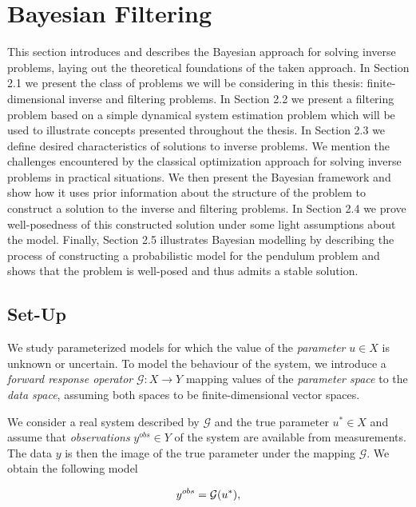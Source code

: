 \section{Bayesian Filtering}

This section introduces and describes the Bayesian approach for solving inverse problems, laying out the theoretical foundations of the taken approach. In Section 2.1 we present the class of problems we will be considering in this thesis: finite-dimensional inverse and filtering problems. In Section 2.2 we present a filtering problem based on a simple dynamical system estimation problem which will be used to illustrate concepts presented throughout the thesis. In Section 2.3 we define desired characteristics of solutions to inverse problems. We mention the challenges encountered by the classical optimization approach for solving inverse problems in practical situations. We then present the Bayesian framework and show how it uses prior information about the structure of the problem to construct a solution to the inverse and filtering problems. In Section 2.4 we prove well-posedness of this constructed solution under some light assumptions about the model. Finally, Section 2.5 illustrates Bayesian modelling by describing the process of constructing a probabilistic model for the pendulum problem and shows that the problem is well-posed and thus admits a stable solution.

\subsection{Set-Up}

We study parameterized models for which the value of the \textit{parameter} $u \in X$ is unknown or uncertain. To model the behaviour of the system, we introduce a \textit{forward response operator} $\mathcal{G} : X \rightarrow Y$ mapping values of the \textit{parameter space} to the \textit{data space}, assuming both spaces to be finite-dimensional vector spaces.

We consider a real system described by $\mathcal{G}$ and the true parameter $u^* \in X$ and assume that \textit{observations} $y^{obs} \in Y$ of the system are available from measurements. The data $y$ is then the image of the true parameter under the mapping $\mathcal{G}$. We obtain the following model

\begin{equation}\label{inverse-formula}
  y^{obs} = \mathcal{G}(u^*),
\end{equation}

